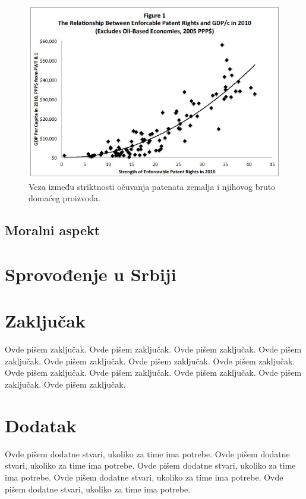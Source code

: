 \documentclass[a4paper]{article}
\begin{document}
\begin{figure}[h!]
\begin{center}
\includegraphics[scale=0.75]{patents_and_gdp.jpg}
\end{center}
\caption{Veza između striktnosti očuvanja patenata zemalja i njihovog bruto domaćeg proizvoda.}
\label{fig:pat_gdp}
\end{figure}

\subsection{Moralni aspekt}
\label{subsec:morala_sam}

\section{Sprovođenje u Srbiji}
\label{sec:srb}

\section{Zaključak}
\label{sec:zakljucak}

Ovde pišem zaključak. 
Ovde pišem zaključak. 
Ovde pišem zaključak. 
Ovde pišem zaključak. 
Ovde pišem zaključak. 
Ovde pišem zaključak. 
Ovde pišem zaključak. 
Ovde pišem zaključak. 
Ovde pišem zaključak. 
Ovde pišem zaključak. 
Ovde pišem zaključak. 
Ovde pišem zaključak. 


\appendix
 


\appendix
\section{Dodatak}
Ovde pišem dodatne stvari, ukoliko za time ima potrebe.
Ovde pišem dodatne stvari, ukoliko za time ima potrebe.
Ovde pišem dodatne stvari, ukoliko za time ima potrebe.
Ovde pišem dodatne stvari, ukoliko za time ima potrebe.
Ovde pišem dodatne stvari, ukoliko za time ima potrebe.
\end{document}

